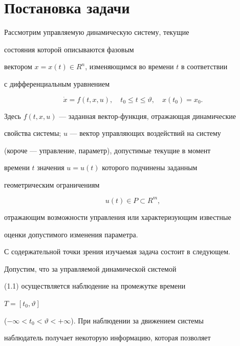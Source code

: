  


\section{Постановка задачи} 


 


Рассмотрим управляемую динамическую систему, текущие 


состояния которой описываются фазовым 


вектором $x=x(t)\in R^n$, изменяющимся во времени $t$ в соответствии 


с дифференциальным уравнением 


\begin{equation} 


\Dot x=f(t,x,u),\quad t_0\le t\le \vartheta,\quad x(t_0)=x_0. 


\end{equation} 


Здесь $f(t,x,u)$ --- заданная вектор-функция, отражающая динамические 


свойства системы; $u$ --- вектор управляющих воздействий на систему 


(короче --- управление, параметр), допустимые текущие в момент 


времени $t$ значения $u=u(t)$ которого подчинены заданным 


геометрическим ограничениям 


\begin{equation} 


u(t)\in P\subset R^m, 


\end{equation} 


отражающим возможности управления или характеризующим известные 


оценки допустимого изменения параметра. 


 


С содержательной точки зрения изучаемая задача состоит в следующем. 


Допустим, что за управляемой динамической системой 


(1.1) осуществляется наблюдение на промежутке времени 


$T=[t_0,\vartheta]$ 


($-\infty<t_0<\vartheta<+\infty$). При наблюдении за движением системы 


наблюдатель получает некоторую информацию, которая позволяет 



